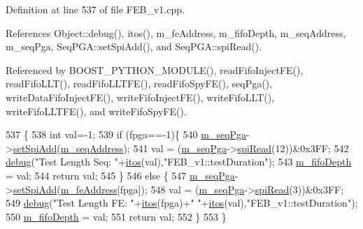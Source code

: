 Definition at line 537 of file F\+E\+B\+\_\+v1.\+cpp.



References Object\+::debug(), itos(), m\+\_\+fe\+Address, m\+\_\+fifo\+Depth, m\+\_\+seq\+Address, m\+\_\+seq\+Pga, Seq\+P\+G\+A\+::set\+Spi\+Add(), and Seq\+P\+G\+A\+::spi\+Read().



Referenced by B\+O\+O\+S\+T\+\_\+\+P\+Y\+T\+H\+O\+N\+\_\+\+M\+O\+D\+U\+L\+E(), read\+Fifo\+Inject\+F\+E(), read\+Fifo\+L\+L\+T(), read\+Fifo\+L\+L\+T\+F\+E(), read\+Fifo\+Spy\+F\+E(), seq\+Pga(), write\+Data\+Fifo\+Inject\+F\+E(), write\+Fifo\+Inject\+F\+E(), write\+Fifo\+L\+L\+T(), write\+Fifo\+L\+L\+T\+F\+E(), and write\+Fifo\+Spy\+F\+E().


\begin{DoxyCode}
537                                 \{
538   \textcolor{keywordtype}{int} val=-1;
539   \textcolor{keywordflow}{if} (fpga==-1)\{
540     \hyperlink{classFEB__v1_a6c7804ac86796f233a8393043adf2e77}{m\_seqPga}->\hyperlink{classSeqPGA_ac998ce3a6d9b5f2e88cc8393f8c1df53}{setSpiAdd}(\hyperlink{classFEB__v1_a1c1eb093fd1733b9510fcf8bc5c7ad08}{m\_seqAddress});
541     val = (\hyperlink{classFEB__v1_a6c7804ac86796f233a8393043adf2e77}{m\_seqPga}->\hyperlink{classSeqPGA_ab3d0e5e5d4014bc7a92588a76b8713d4}{spiRead}(12))&0x3FF;
542     \hyperlink{classObject_aac010553f022165573714b7014a15f0d}{debug}(\textcolor{stringliteral}{"Test Length Seq: "}+\hyperlink{Tools_8h_af330027dbdafb9a30768b3613c553e60}{itos}(val),\textcolor{stringliteral}{"FEB\_v1::testDuration"});
543     \hyperlink{classFEB__v1_a30473bcdd8f018ad5dac728f6779df9c}{m\_fifoDepth} = val;
544     \textcolor{keywordflow}{return} val;
545   \}
546   \textcolor{keywordflow}{else} \{
547     \hyperlink{classFEB__v1_a6c7804ac86796f233a8393043adf2e77}{m\_seqPga}->\hyperlink{classSeqPGA_ac998ce3a6d9b5f2e88cc8393f8c1df53}{setSpiAdd}(\hyperlink{classFEB__v1_a4e1945c2d5b434125f375e9d0fc6d99f}{m\_feAddress}[fpga]);
548     val = (\hyperlink{classFEB__v1_a6c7804ac86796f233a8393043adf2e77}{m\_seqPga}->\hyperlink{classSeqPGA_ab3d0e5e5d4014bc7a92588a76b8713d4}{spiRead}(3))&0x3FF;
549     \hyperlink{classObject_aac010553f022165573714b7014a15f0d}{debug}(\textcolor{stringliteral}{"Test Length FE: "}+\hyperlink{Tools_8h_af330027dbdafb9a30768b3613c553e60}{itos}(fpga)+\textcolor{stringliteral}{" "}+\hyperlink{Tools_8h_af330027dbdafb9a30768b3613c553e60}{itos}(val),\textcolor{stringliteral}{"FEB\_v1::testDuration"});
550     \hyperlink{classFEB__v1_a30473bcdd8f018ad5dac728f6779df9c}{m\_fifoDepth} = val;
551     \textcolor{keywordflow}{return} val;
552   \}
553 \}
\end{DoxyCode}
\mbox{\label{classFEB__v1_a7b948b40f3034ccfb0a696b5cf9c5c6c}} 
